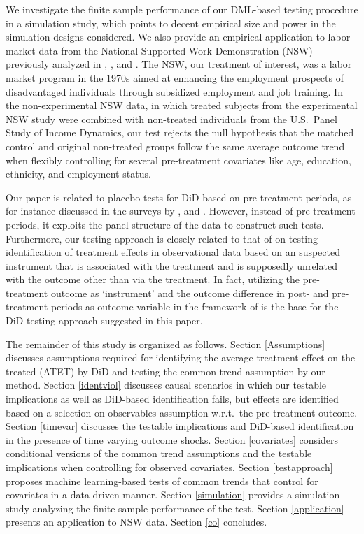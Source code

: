 {	We investigate the finite sample performance of our DML-based testing procedure in a simulation study, which points to decent empirical size and power in the simulation designs considered. We also provide an empirical application to labor market data from the National Supported Work Demonstration (NSW) previously analyzed in \cite{LaLonde86}, \cite{DehejiaWahba99}, and \cite{DeWa02}. The NSW, our treatment of interest, was a labor market program in the 1970s aimed at enhancing the employment prospects of disadvantaged individuals through subsidized employment and job training. In the non-experimental NSW data, in which treated subjects from the experimental NSW study were combined with non-treated individuals from the U.S.\ Panel Study of Income Dynamics, our test rejects the null hypothesis that the matched control and original non-treated groups follow the same average outcome trend when flexibly controlling for several pre-treatment covariates like age, education, ethnicity, and employment status. 	
	
	Our paper is related to placebo tests for DiD based on pre-treatment periods, as for instance discussed in the surveys by \cite{Lechner2010}, and \cite{Rothetal2022}. However, instead of pre-treatment periods, it exploits  the panel structure of the data to construct such tests. Furthermore, our testing approach is closely related to that of  \cite{HuberKueck2022} on testing identification of treatment effects in observational data based on an suspected instrument that is associated with the treatment and is supposedly unrelated with the outcome other than via the treatment. In fact, utilizing the pre-treatment outcome as `instrument' and the outcome difference in post- and pre-treatment periods as outcome variable in the framework of \cite{HuberKueck2022} is the base for the DiD testing approach suggested in this paper. 

	The remainder of this study is organized as follows. Section \ref{Assumptions} discusses assumptions required for identifying the average treatment effect on the treated (ATET) by DiD and testing the common trend assumption by our method. Section \ref{identviol} discusses causal scenarios in which our testable implications as well as DiD-based identification fails, but effects are identified based on a selection-on-observables assumption w.r.t.\ the pre-treatment outcome. Section \ref{timevar} discusses the testable implications and DiD-based identification in the presence of time varying outcome shocks. Section \ref{covariates} considers conditional versions of the common trend assumptions and the testable implications when controlling for observed covariates. Section \ref{testapproach}  proposes machine learning-based tests of common trends that control for covariates in a data-driven manner. 	
	 Section \ref{simulation} provides a simulation study analyzing the finite sample performance of the test. Section \ref{application} presents an application to NSW data. Section \ref{co} concludes.
	
}
